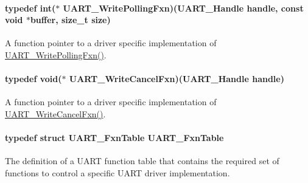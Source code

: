 \paragraph[{U\-A\-R\-T\-\_\-\-Write\-Polling\-Fxn}]{\setlength{\rightskip}{0pt plus 5cm}typedef int($\ast$ U\-A\-R\-T\-\_\-\-Write\-Polling\-Fxn)({\bf U\-A\-R\-T\-\_\-\-Handle} handle, const void $\ast$buffer, size\-\_\-t size)}\label{_u_a_r_t_8h_ac7a41a69d6a6f895dcf2276f1ca7bc6c}


A function pointer to a driver specific implementation of \hyperlink{_u_a_r_t_8h_ac7a41a69d6a6f895dcf2276f1ca7bc6c}{U\-A\-R\-T\-\_\-\-Write\-Polling\-Fxn()}. 

\paragraph[{U\-A\-R\-T\-\_\-\-Write\-Cancel\-Fxn}]{\setlength{\rightskip}{0pt plus 5cm}typedef void($\ast$ U\-A\-R\-T\-\_\-\-Write\-Cancel\-Fxn)({\bf U\-A\-R\-T\-\_\-\-Handle} handle)}\label{_u_a_r_t_8h_a0fdca649842b40bf9bdbc6e83698eea5}


A function pointer to a driver specific implementation of \hyperlink{_u_a_r_t_8h_a0fdca649842b40bf9bdbc6e83698eea5}{U\-A\-R\-T\-\_\-\-Write\-Cancel\-Fxn()}. 

\paragraph[{U\-A\-R\-T\-\_\-\-Fxn\-Table}]{\setlength{\rightskip}{0pt plus 5cm}typedef struct {\bf U\-A\-R\-T\-\_\-\-Fxn\-Table}  {\bf U\-A\-R\-T\-\_\-\-Fxn\-Table}}\label{_u_a_r_t_8h_a24d497f125179ba5e5b16ad9a0aa249d}


The definition of a U\-A\-R\-T function table that contains the required set of functions to control a specific U\-A\-R\-T driver implementation. 

